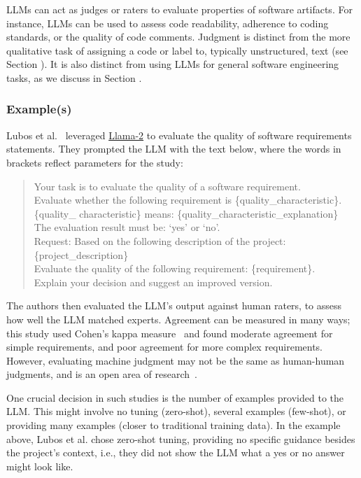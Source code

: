 LLMs can act as judges or raters to evaluate properties of software artifacts.
For instance, LLMs can be used to assess code readability, adherence to coding standards, or the quality of code comments.
Judgment is distinct from the more qualitative task of assigning a code or label to, typically unstructured, text (see Section \annotators).
It is also distinct from using LLMs for general software engineering tasks, as we discuss in Section \llmsforresearcher.

\subsubsection{Example(s)}

Lubos et al.~\cite{DBLP:conf/re/LubosFTGMEL24} leveraged \href{https://www.llama.com/llama2/}{Llama-2} to evaluate the quality of software requirements statements. 
They prompted the LLM with the text below, where the words in brackets reflect parameters for the study:

\begin{quote}
Your task is to evaluate the quality of a software requirement.\\
Evaluate whether the following requirement is \{quality\_characteristic\}. \\
\{quality\_ characteristic\} means: \{quality\_characteristic\_explanation\}\\
The evaluation result must be: `yes' or `no'.\\
Request: Based on the following description of the project:
\{project\_description\}\\
Evaluate the quality of the following requirement: \{requirement\}.\\
Explain your decision and suggest an improved version.\\
\end{quote}

The authors then evaluated the LLM's output against human raters, to assess how well the LLM matched experts. 
Agreement can be measured in many ways; this study used Cohen's kappa measure~\cite{cohen60} and found moderate agreement for simple requirements, and poor agreement for more complex requirements.
However, evaluating machine judgment may not be the same as human-human judgments, and is an open area of research~\cite{DBLP:journals/corr/abs-2410-03775}. 

One crucial decision in such studies is the number of examples provided to the LLM.
This might involve no tuning (zero-shot), several examples (few-shot), or providing many examples (closer to traditional training data).
In the example above, Lubos et al. chose zero-shot tuning, providing no specific guidance besides the project's context, i.e., they did not show the LLM what a yes or no answer might look like. 

